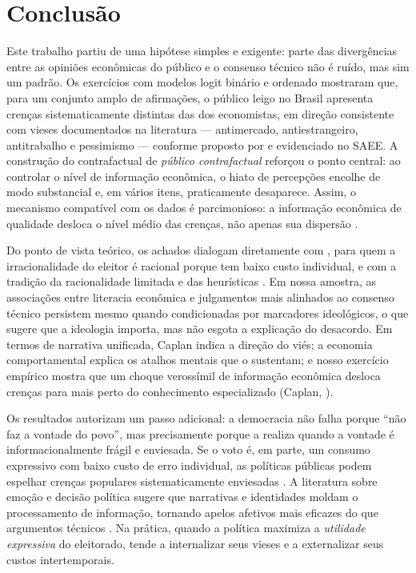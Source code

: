 \chapter{Conclusão}

Este trabalho partiu de uma hipótese simples e exigente: parte das divergências entre as opiniões econômicas do público e o consenso técnico não é ruído, mas sim um padrão. Os exercícios com modelos logit binário e ordenado mostraram que, para um conjunto amplo de afirmações, o público leigo no Brasil apresenta crenças sistematicamente distintas das dos economistas, em direção consistente com vieses documentados na literatura — antimercado, antiestrangeiro, antitrabalho e pessimismo — conforme proposto por  e evidenciado no SAEE. A construção do contrafactual de \textit{público contrafactual} reforçou o ponto central: ao controlar o nível de informação econômica, o hiato de percepções encolhe de modo substancial e, em vários itens, praticamente desaparece. Assim, o mecanismo compatível com os dados é parcimonioso: a informação econômica de qualidade desloca o nível médio das crenças, não apenas sua dispersão \cite{downs1957economic,simon1955behavioral,Judgment_under_Uncertainty}.

Do ponto de vista teórico, os achados dialogam diretamente com , para quem a irracionalidade do eleitor é racional porque tem baixo custo individual, e com a tradição da racionalidade limitada e das heurísticas \cite{simon1955behavioral,Judgment_under_Uncertainty}. Em nossa amostra, as associações entre literacia econômica e julgamentos mais alinhados ao consenso técnico persistem mesmo quando condicionadas por marcadores ideológicos, o que sugere que a ideologia importa, mas não esgota a explicação do desacordo. Em termos de narrativa unificada, Caplan indica a direção do viés; a economia comportamental explica os atalhos mentais que o sustentam; e nosso exercício empírico mostra que um choque verossímil de informação econômica desloca crenças para mais perto do conhecimento especializado (Caplan, \citeyear{Systematically_Biased_Beliefs_about_Economics,The_Myth_of_the_Rational_Voter}).

Os resultados autorizam um passo adicional: a democracia não falha porque “não faz a vontade do povo”, mas precisamente porque a realiza quando a vontade é informacionalmente frágil e enviesada. Se o voto é, em parte, um consumo expressivo com baixo custo de erro individual, as políticas públicas podem espelhar crenças populares sistematicamente enviesadas \cite{The_Myth_of_the_Rational_Voter}. A literatura sobre emoção e decisão política sugere que narrativas e identidades moldam o processamento de informação, tornando apelos afetivos mais eficazes do que argumentos técnicos \cite{westen2007political}. Na prática, quando a política maximiza a \textit{utilidade expressiva} do eleitorado, tende a internalizar seus vieses e a externalizar seus custos intertemporais.

